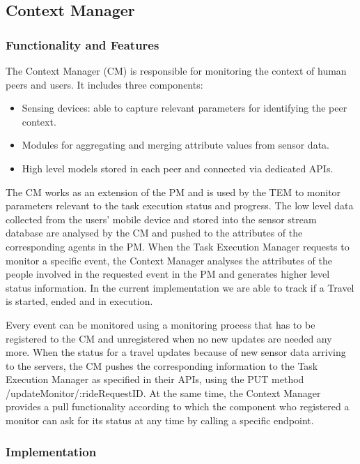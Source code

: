 \subsection{Context Manager}
\subsubsection{Functionality and Features}
The Context Manager (CM) is responsible for monitoring the context of human peers and users. %
It includes three components:
\begin{itemize}
\item Sensing devices: able to capture relevant parameters for identifying the peer context.
\item Modules for aggregating and merging attribute values from sensor data.
\item High level models stored in each peer and connected via dedicated APIs.
\end{itemize}
The CM works as an extension of the PM and is used by the TEM to monitor parameters relevant to the task execution status and progress. The low level data collected from the users' mobile device and stored into the sensor stream database are analysed by the CM and pushed to the attributes of the corresponding agents in the PM. When the Task Execution Manager requests to monitor a specific event, the Context Manager analyses the attributes of the people involved in the requested event in the PM and generates higher level status information. In the current implementation we are able to track if a Travel is started, ended and in execution.

Every event can be monitored using a monitoring process that has to be registered to the CM and unregistered when no new updates are needed any more. When the status for a travel updates because of new sensor data arriving to the servers, the CM pushes the corresponding information to the Task Execution Manager as specified in their APIs, using the PUT method /updateMonitor/:rideRequestID. At the same time, the Context Manager provides a pull functionality according to which the component who registered a monitor can ask for its status at any time by calling a specific endpoint.

\subsubsection{Implementation}

